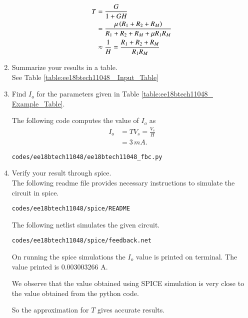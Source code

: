 \begin{enumerate}[label=\arabic*.,ref=\theenumi]
\solution
\begin{align}
T &= \frac{G}{1+GH} \label{eq:ee18btech11048_T}
\\
&= \frac{\mu \left(R_1+R_2+R_M\right)}{R_1+R_2+R_M+ \mu R_1R_M}
\\
 &\approx \frac{1}{H}  = \frac{R_1+R_2+R_M}{R_1R_M} 
\end{align}

\item Summarize your results in a table.
\\
\solution See Table \ref{table:ee18btech11048_ Input_Table}


\begin{table}[!ht]
\centering

\caption{}
\label{table:ee18btech11048_ Input_Table}
\end{table}


\item Find $I_o$ for the parameters given in  Table  \ref{table:ee18btech11048_ Example_Table}.\\
\begin{table}[!ht]
\centering

\caption{}
\label{table:ee18btech11048_ Example_Table}
\end{table}
\solution  The following code computes the value of $I_o$ as 
\begin{align}
I_o &= TV_s = \frac{V_s}{H}
\\
&= 3 \, mA.
\end{align}
\begin{lstlisting}
codes/ee18btech11048/ee18btech11048_fbc.py
\end{lstlisting}
\item Verify your result through spice.
\\
\solution The following readme file provides necessary instructions to simulate the circuit in spice.
\begin{lstlisting}
codes/ee18btech11048/spice/README
\end{lstlisting}

The following netlist simulates the given circuit.
\begin{lstlisting}
codes/ee18btech11048/spice/feedback.net
\end{lstlisting}
On running the spice simulations the $I_o$ value is printed on terminal.
The value printed is 0.003003266 A.

We observe that the value obtained using SPICE simulation is very close to the value obtained from the python code.

So the approximation for $T$ gives accurate results.
\end{enumerate}
